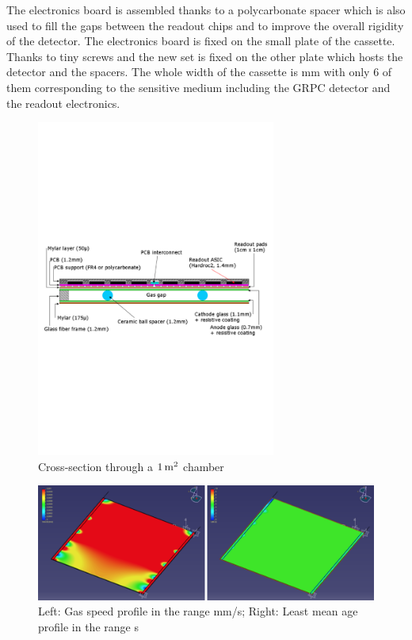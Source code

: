 The electronics board is assembled thanks to a polycarbonate spacer which is
also used to fill the gaps between the readout chips and to improve the overall
rigidity of the detector. The electronics board is fixed on the small plate of
the cassette. Thanks to tiny screws and the new set is fixed on the other plate
which hosts the detector and the spacers. The whole width of the cassette is \unit[11]{mm}
with only 6 of them corresponding to the sensitive medium including the GRPC
detector and the readout electronics.


\begin{figure}
\centering
\includegraphics[width=0.70\textwidth]{Calorimeter/SDHCAL_GRPC/figures/chamber}
\caption{Cross-section through a $\unit[1]{m^2}$ chamber}
\label{fig:Calorimeter:SDHCAL_GRPC:chamber}
\end{figure}


\begin{figure}
\centering
\includegraphics[width=.9\textwidth]{Calorimeter/SDHCAL_GRPC/figures/gas.png}
\caption{Left: Gas speed profile in the range \unit[0--1]{mm/s}; Right: Least mean age profile in the range \unit[0--10]{s}}
\label{fig:Calorimeter:SDHCAL_GRPC:gas_distribution}
\end{figure}

